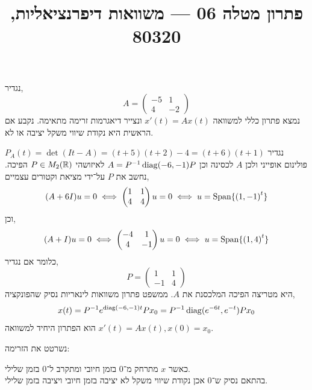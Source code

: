 
\title{פתרון מטלה 06 --- משוואות דיפרנציאליות, 80320}

\usepackage{pgfplots, tikz, pgffor}
\usetikzlibrary{math}
\pgfplotsset{compat=1.18}


\maketitle
\maketitleprint[blue]{}

\question{}
\subquestion{}
נגדיר,
\[
	A
	= \begin{pmatrix}
		-5 & 1 \\
		4 & -2
	\end{pmatrix}
\]
נמצא פתרון כללי למשוואה $x'(t) = A x(t)$ ונצייר דיאגרמות זרימה מתאימה.
נקבע אם הראשית היא נקודת שיווי משקל יציבה או לא.
\begin{solution}
	נגדיר $P_A(t) = \det(I t - A) = (t + 5)(t + 2) - 4 = (t + 6)(t + 1)$ פולינום אופייני ולכן $A$ לכסינה וכן $A = P^{-1} \operatorname{diag}(-6, -1) P$ לאיזושהי $P \in M_2(\mathbb{R})$ הפיכה.
	נחשב את $P$ על־ידי מציאת וקטורים עצמיים,
	\[
		(A + 6 I) u = 0
		\iff \begin{pmatrix}
			1 & 1 \\
			4 & 4
		\end{pmatrix} u = 0
		\iff u = \operatorname{Span}\{ {(1, -1)}^t \}
	\]
	וכן,
	\[
		(A + I) u = 0
		\iff \begin{pmatrix}
			-4 & 1 \\
			4 & -1
		\end{pmatrix} u = 0
		\iff u = \operatorname{Span}\{ {(1, 4)}^t \}
	\]
	כלומר אם נגדיר,
	\[
		P
		= \begin{pmatrix}
			1 & 1 \\
			-1 & 4
		\end{pmatrix}
	\]
	היא מטריצה הפיכה המלכסנת את $A$.
	ממשפט פתרון משוואות לינאריות נסיק שהפונקציה,
	\[
		x(t)
		= P^{-1} e^{\operatorname{diag}(-6, -1) t} P x_0
		= P^{-1} \operatorname{diag}(e^{-6 t}, e^{-t}) P x_0
	\]
	הוא הפתרון היחיד למשוואה $x'(t) = A x(t), x(0) = x_0$.

	נשרטט את הזרימה:
	\begin{otherlanguage}{english}
		\begin{center}
		\end{center}
	\end{otherlanguage}
	כאשר $x$ מתרחק מ־$0$ בזמן חיובי ומתקרב ל־$0$ בזמן שלילי. \\
	בהתאם נסיק ש־$0$ אכן נקודת שיווי משקל לא יציבה בזמן חיובי ויציבה בזמן שלילי.
\end{solution}

